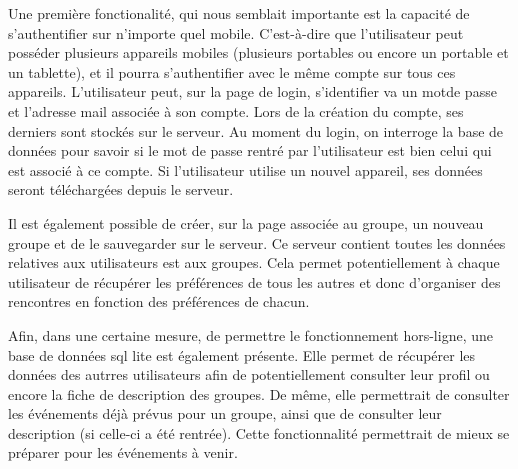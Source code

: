 Une première fonctionalité, qui nous semblait importante est la capacité de s'authentifier sur n'importe quel mobile. C'est-à-dire
que l'utilisateur peut posséder  plusieurs appareils mobiles (plusieurs portables ou encore un portable et un tablette), et il
pourra s'authentifier avec le même compte sur tous ces appareils. L'utilisateur peut, sur la page de login, s'identifier va un
motde passe et l'adresse mail associée à son compte. Lors de la création du compte, ses derniers sont stockés sur le serveur.
Au moment du login, on interroge la base de données pour savoir si le mot de passe rentré par l'utilisateur est bien celui qui est
associé à ce compte. Si l'utilisateur utilise un nouvel appareil, ses données seront téléchargées depuis le serveur.
\newline

Il est également possible de créer, sur la page associée au groupe, un nouveau groupe et de le sauvegarder sur le serveur. Ce
serveur contient toutes les données relatives aux utilisateurs est aux groupes. Cela permet potentiellement à chaque utilisateur
de récupérer les préférences de tous les autres et donc d'organiser des rencontres en fonction des préférences de chacun.
\newline

Afin, dans une certaine mesure, de permettre le fonctionnement hors-ligne, une base de données sql lite est également présente.
Elle permet de récupérer les données des autrres utilisateurs afin de potentiellement consulter leur profil ou encore la fiche de
description des groupes. De même, elle permettrait de consulter les événements déjà prévus pour un groupe, ainsi que de consulter
leur description (si celle-ci a été rentrée). Cette fonctionnalité permettrait de mieux se préparer pour les événements à venir.
